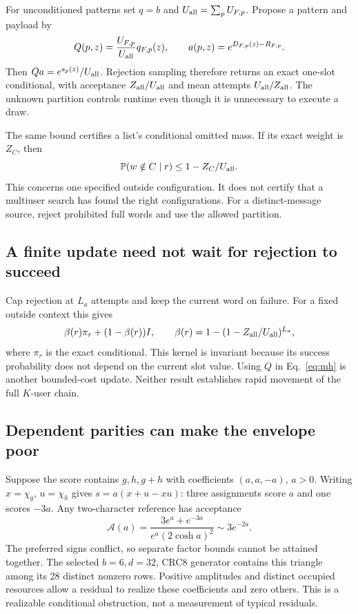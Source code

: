 \documentclass[10pt,a4paper]{article}
\newcommand{\Prb}{\mathbb P}
\begin{document}
For unconditioned patterns set $q=b$ and $U_{\rm all}=\sum_pU_{F,p}$. Propose a pattern and payload by
\begin{equation}
 Q(p,z)=\frac{U_{F,p}}{U_{\rm all}}q_{F,p}(z),\qquad
 a(p,z)=e^{D_{F,p}(z)-R_{F,p}}.
 \label{eq:rejection}
\end{equation}
Then $Qa=e^{s_p(z)}/U_{\rm all}$. Rejection sampling therefore returns an exact one-slot conditional,
with acceptance $Z_{\rm all}/U_{\rm all}$ and mean attempts $U_{\rm all}/Z_{\rm all}$.
The unknown partition controls runtime even though it is unnecessary to execute a draw.

The same bound certifies a list's conditional omitted mass. If its exact weight is $Z_C$, then
\begin{equation}
 \Prb(w\notin C\mid r)\leq1-Z_C/U_{\rm all}.
 \label{eq:listmass}
\end{equation}
This concerns one specified outside configuration. It does not certify that a multiuser search has found
the right configurations. For a distinct-message source, reject prohibited full words and use the allowed partition.

\subsection{A finite update need not wait for rejection to succeed}
Cap rejection at $L_a$ attempts and keep the current word on failure. For a fixed outside context this gives
\[
 \beta(r)\pi_r+(1-\beta(r))I,\qquad
 \beta(r)=1-(1-Z_{\rm all}/U_{\rm all})^{L_a},
\]
where $\pi_r$ is the exact conditional. This kernel is invariant because its success probability does not
depend on the current slot value. Using $Q$ in Eq.~\eqref{eq:mh} is another bounded-cost update.
Neither result establishes rapid movement of the full $K$-user chain.

\subsection{Dependent parities can make the envelope poor}
Suppose the score contains $g,h,g+h$ with coefficients $(a,a,-a)$, $a>0$. Writing
$x=\chi_g$, $u=\chi_h$ gives $s=a(x+u-xu)$: three assignments score $a$ and one scores $-3a$.
Any two-character reference has acceptance
\begin{equation}
 \mathcal A(a)=\frac{3e^a+e^{-3a}}{e^a(2\cosh a)^2}\sim3e^{-2a}.
 \label{eq:conflict}
\end{equation}
The preferred signs conflict, so separate factor bounds cannot be attained together. The selected
$b=6,d=32$, CRC8 generator contains this triangle among its 28 distinct nonzero rows. Positive amplitudes
and distinct occupied resources allow a residual to realize these coefficients and zero others.
This is a realizable conditional obstruction, not a measurement of typical residuals.
\end{document}
